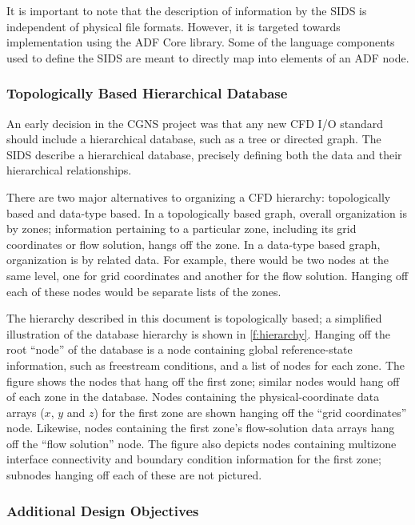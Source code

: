 It is important to note that the description of information by the
SIDS is independent of physical file formats.  However, it is targeted
towards implementation using the ADF Core library.  Some of the language
components used to define the SIDS are meant to directly map into
elements of an ADF node.

\subsubsection*{Topologically Based Hierarchical Database}

An early decision in the CGNS project was that any new CFD I/O standard 
should include a hierarchical database, such as a tree or directed graph.
The SIDS describe a hierarchical database, precisely defining both the
data and their hierarchical relationships.

There are two major alternatives to organizing a CFD hierarchy:
topologically based and data-type based.  In a topologically based
graph, overall organization is by zones; information pertaining to a
particular zone, including its grid coordinates or flow solution, hangs
off the zone.  In a data-type based graph, organization is by related
data.  For example, there would be two nodes at the same level, one for
grid coordinates and another for the flow solution.  Hanging off each of
these nodes would be separate lists of the zones.



The hierarchy described in this document is topologically based;
a simplified illustration of the database hierarchy is shown in
\autoref{f:hierarchy}.  Hanging off the root ``node'' of the database is a
node containing global reference-state information, such as freestream
conditions, and a list of nodes for each zone.  The figure shows the
nodes that hang off the first zone; similar nodes would hang off of each
zone in the database.  Nodes containing the physical-coordinate data
arrays ($x$, $y$ and $z$) for the first zone are shown hanging off the
``grid coordinates'' node.  Likewise, nodes containing the first zone's
flow-solution data arrays hang off the ``flow solution'' node.  The figure
also depicts nodes containing multizone interface connectivity and
boundary condition information for the first zone; subnodes hanging off
each of these are not pictured.

\subsubsection*{Additional Design Objectives}

